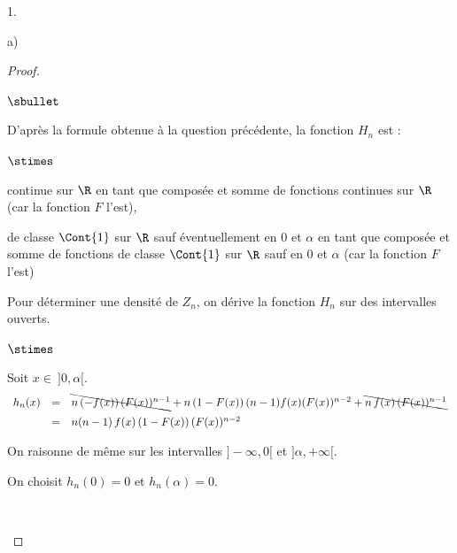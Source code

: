 \begin{noliste}{1.}
\begin{noliste}{a)}
    \begin{proof}~
      \begin{noliste}{$\sbullet$}
	\item D'après la formule obtenue à la question précédente, 
	la fonction $H_n$ est :
	\begin{noliste}{$\stimes$}
	  \item continue sur $\R$ en tant que composée et somme de 
	  fonctions continues sur $\R$ (car la fonction $F$ l'est),
	  
	  \item de classe $\Cont{1}$ sur $\R$ sauf éventuellement 
	  en $0$ et $\alpha$ en tant que composée et somme de 
	  fonctions de classe $\Cont{1}$ sur $\R$ sauf 
	  en $0$ et $\alpha$ (car la fonction $F$ l'est)
	\end{noliste}
	
	
	\newpage
	
	
	\item Pour déterminer une densité de $Z_n$, on dérive la 
	fonction $H_n$ sur des intervalles ouverts.
	\begin{noliste}{$\stimes$}
	  \item Soit $x\in \ ]0, \alpha[$.
	  \[
	    \begin{array}{rcl}
	      h_n(x) & = & \bcancel{n \, (-f(x)) \, (F(x))^{n-1}} + n \, 
	      (1-F(x)) \, (n-1)f(x)(F(x))^{n-2} + 
	      \bcancel{n \, f(x) \, (F(x))^{n-1}}
	      \\[.2cm]
	      & = & n(n-1) \, f(x) \, (1-F(x)) \, (F(x))^{n-2}
	    \end{array}
	  \]
	  
	  \item On raisonne de même sur les intervalles $]-\infty, 0[$ 
	  et $]\alpha, +\infty[$.
	  
	  \item On choisit $h_n(0)=0$ et $h_n(\alpha)=0$.
	\end{noliste}
	~\\[-1.4cm]
      \end{noliste}
    \end{proof}
  \end{noliste}
  

\end{noliste}
